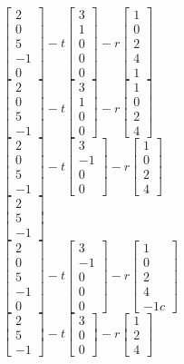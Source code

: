 \documentclass[12pt, answers]{exam}
\newcommand{\ibmatrix}[1]{\begin{bmatrix}#1\end{bmatrix}} %
\begin{document}
\begin{multicols*}{2}
\begin{questions}
		\begin{oneparchoices}
			{
				\def\arraystretch{1.1}
				\choice $\ibmatrix{2\\0\\5\\-1\\0} - t \ibmatrix{3\\1\\0\\0\\0} - r \ibmatrix{1\\0\\2\\4\\1}$\\[+1em]
				\choice $\ibmatrix{2\\0\\5\\-1} - t \ibmatrix{3\\1\\0\\0} - r \ibmatrix{1\\0\\2\\4}$\\[+1em]
				\choice $\ibmatrix{2\\0\\5\\-1} - t \ibmatrix{3\\-1\\0\\0} - r \ibmatrix{1\\0\\2\\4}$\\[+1em]
				\choice $\ibmatrix{2\\5\\-1}$\\[+1em]
				\choice $\ibmatrix{2\\0\\5\\-1\\0} - t \ibmatrix{3\\-1\\0\\0\\0} - r \ibmatrix{1\\0\\2\\4\\-1c}$\\[+1em]
				\choice $\ibmatrix{2\\5\\-1} - t \ibmatrix{3\\0\\0} - r \ibmatrix{1\\2\\4}$\\
			}
		\end{oneparchoices}


\end{questions}
\end{multicols*}
\end{document}

